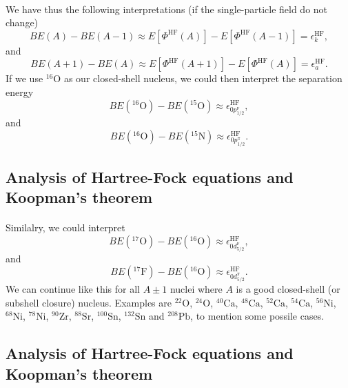 \documentclass[%
twoside,                 %
final,                   %
10pt]{article}
\begin{document}
\paragraph{}
We have thus the following interpretations (if the single-particle field do not change)
\[
BE(A)-BE(A-1)\approx  E[\Phi^{\mathrm{HF}}(A)]-   E[\Phi^{\mathrm{HF}}(A-1)] 
  = \epsilon_k^{\mathrm{HF}}, 
\]
and
\[
BE(A+1)-BE(A)\approx  E[\Phi^{\mathrm{HF}}(A+1)]-   E[\Phi^{\mathrm{HF}}(A)] =  \epsilon_a^{\mathrm{HF}}. 
\]
If  we use ${}^{16}\mbox{O}$ as our closed-shell nucleus, we could then interpret the separation energy
\[
BE(^{16}\mathrm{O})-BE(^{15}\mathrm{O})\approx \epsilon_{0p^{\nu}_{1/2}}^{\mathrm{HF}}, 
\]
and
\[
BE(^{16}\mathrm{O})-BE(^{15}\mathrm{N})\approx \epsilon_{0p^{\pi}_{1/2}}^{\mathrm{HF}}.
\]



\subsection*{Analysis of Hartree-Fock equations and Koopman's theorem}

\paragraph{}
Similalry, we could interpret
\[
BE(^{17}\mathrm{O})-BE(^{16}\mathrm{O})\approx \epsilon_{0d^{\nu}_{5/2}}^{\mathrm{HF}}, 
\]
and 
\[
BE(^{17}\mathrm{F})-BE(^{16}\mathrm{O})\approx\epsilon_{0d^{\pi}_{5/2}}^{\mathrm{HF}}.
\]
We can continue like this for all $A\pm 1$ nuclei where $A$ is a good closed-shell (or subshell closure)
nucleus. Examples are ${}^{22}\mbox{O}$, ${}^{24}\mbox{O}$, ${}^{40}\mbox{Ca}$, ${}^{48}\mbox{Ca}$, ${}^{52}\mbox{Ca}$, ${}^{54}\mbox{Ca}$, ${}^{56}\mbox{Ni}$, 
${}^{68}\mbox{Ni}$, ${}^{78}\mbox{Ni}$, ${}^{90}\mbox{Zr}$, ${}^{88}\mbox{Sr}$, ${}^{100}\mbox{Sn}$, ${}^{132}\mbox{Sn}$ and ${}^{208}\mbox{Pb}$, to mention some possile cases.



\subsection*{Analysis of Hartree-Fock equations and Koopman's theorem}

\end{document}

